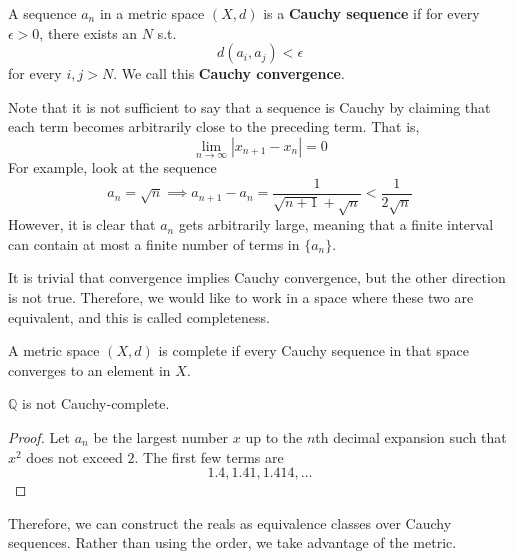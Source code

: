   \begin{definition}
    A sequence $a_n$ in a metric space $(X, d)$ is a \textbf{Cauchy sequence} if for every $\epsilon > 0$, there exists an $N$ s.t. 
    \begin{equation}
      d(a_i, a_j) < \epsilon
    \end{equation}
    for every $i, j > N$. We call this \textbf{Cauchy convergence}. 
  \end{definition}

  Note that it is not sufficient to say that a sequence is Cauchy by claiming that each term becomes arbitrarily close to the preceding term. That is, 
  \begin{equation}
    \lim_{n \rightarrow \infty} |x_{n+1} - x_{n}| = 0
  \end{equation}
  For example, look at the sequence 
  \begin{equation}
    a_n = \sqrt{n} \implies a_{n+1} - a_{n} = \frac{1}{\sqrt{n+1} + \sqrt{n}} < \frac{1}{2\sqrt{n}}
  \end{equation}
  However, it is clear that $a_n$ gets arbitrarily large, meaning that a finite interval can contain at most a finite number of terms in $\{a_n\}$. 

  It is trivial that convergence implies Cauchy convergence, but the other direction is not true. Therefore, we would like to work in a space where these two are equivalent, and this is called completeness. 

  \begin{definition}
    A metric space $(X, d)$ is complete if every Cauchy sequence in that space converges to an element in $X$. 
  \end{definition} 

  \begin{theorem}
    $\mathbb{Q}$ is not Cauchy-complete. 
  \end{theorem}
  \begin{proof}
    Let $a_n$ be the largest number $x$ up to the $n$th decimal expansion such that $x^2$ does not exceed $2$. The first few terms are 
    \begin{equation}
      1.4, 1.41, 1.414, \ldots
    \end{equation}
  \end{proof}

  Therefore, we can construct the reals as equivalence classes over Cauchy sequences. Rather than using the order, we take advantage of the metric. 

